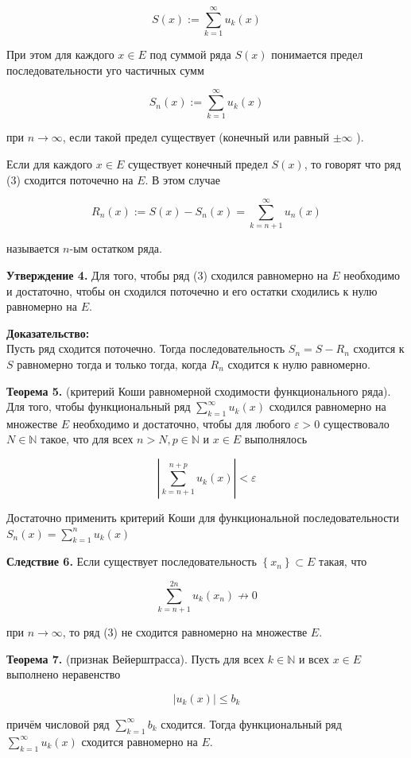 \documentclass[a4paper,12pt]{article} %
\begin{document}
	$$
	S(x):=\sum_{k=1}^{\infty} u_{k}(x)
	$$
	
	При этом для каждого $x \in E$ под суммой ряда $S(x)$ понимается предел последовательности уго частичных сумм
	
	$$
	S_{n}(x):=\sum_{k=1}^{\infty} u_{k}(x)
	$$
	
	при $n \rightarrow \infty$, если такой предел существует (конечный или равный $\pm \infty$ ).
	
	Если для каждого $x \in E$ существует конечный предел $S(x)$, то говорят что ряд (3) сходится поточечно на $E$. В этом случае
	
	$$
	R_{n}(x):=S(x)-S_{n}(x)=\sum_{k=n+1}^{\infty} u_{n}(x)
	$$
	
	называется $n$-ым остатком ряда.
	
	\textbf{Утверждение 4.} Для того, чтобы ряд (3) сходился равномерно на $E$ необходимо и достаточно, чтобы он сходился поточечно и его остатки сходились к нулю равномерно на $E$.
	
	\textbf{Доказательство:\\}
	Пусть ряд сходится поточечно. Тогда последовательность $S_{n}=S-R_{n}$ сходится к $S$ равномерно тогда и только тогда, когда $R_{n}$ сходится к нулю равномерно.
	
	\textbf{Теорема 5.} (критерий Коши равномерной сходимости функционального ряда). Для того, чтобы функциональный ряд $\sum_{k=1}^{\infty} u_{k}(x)$ сходился равномерно на множестве $E$ необходимо и достаточно, чтобы для любого $\varepsilon>0$ существовало $N \in \mathbb{N}$ такое, что для всех $n>N, p \in \mathbb{N}$ и $x \in E$ выполнялось
	
	$$
	\left|\sum_{k=n+1}^{n+p} u_{k}(x)\right|<\varepsilon
	$$
	
	Достаточно применить критерий Коши для функциональной последовательности $S_{n}(x)=\sum_{k=1}^{n} u_{k}(x)$
	
	\textbf{Следствие 6.} Если существует последовательность $\left\{x_{n}\right\} \subset E$ такая, что
	
	$$
	\sum_{k=n+1}^{2 n} u_{k}\left(x_{n}\right) \not \rightarrow 0
	$$
	
	при $n \rightarrow \infty$, то ряд (3) не сходится равномерно на множестве $E$.
	
	\textbf{Теорема 7.} (признак Вейерштрасса). Пусть для всех $k \in \mathbb{N}$ и всех $x \in E$ выполнено неравенство
	
	$$
	\left|u_{k}(x)\right| \leq b_{k}
	$$
	
	причём числовой ряд $\sum_{k=1}^{\infty} b_{k}$ сходится. Тогда функциональный ряд $\sum_{k=1}^{\infty} u_{k}(x)$ сходится равномерно на $E$.
	
\end{document}

